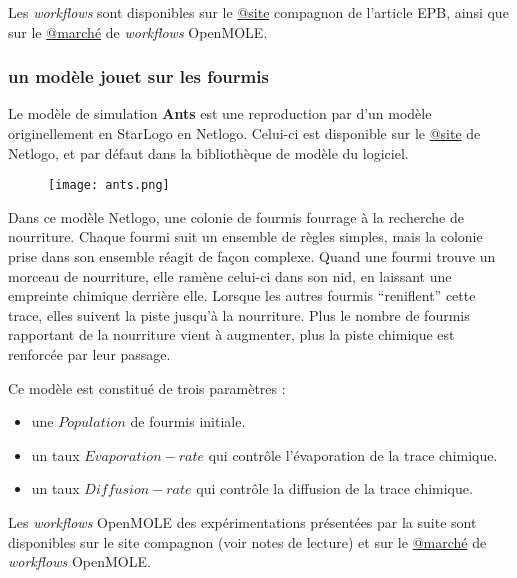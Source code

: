Les \textit{workflows} sont disponibles sur le \href{https://github.com/ISCPIF/simpoplocal-epb}{@site} compagnon de l'article EPB, ainsi que sur le \href{https://github.com/openmole/openmole-market}{@marché} de \textit{workflows} OpenMOLE.

\subsubsection{un modèle jouet sur les fourmis}

Le modèle de simulation \textbf{Ants} est une reproduction par \textcite{Wilensky1997} d'un modèle originellement en StarLogo en Netlogo. Celui-ci est disponible sur le \href{http://ccl.northwestern.edu/netlogo/models/Ants}{@site} de Netlogo, et par défaut dans la bibliothèque de modèle du logiciel.

\begin{figure}[H]
		\centering
	 	\texttt{[image: ants.png]}
\end{figure}

Dans ce modèle Netlogo, une colonie de fourmis fourrage à la recherche de nourriture. Chaque fourmi suit un ensemble de règles simples, mais la colonie prise dans son ensemble réagit de façon complexe. Quand une fourmi trouve un morceau de nourriture, elle ramène celui-ci dans son nid, en laissant une empreinte chimique derrière elle. Lorsque les autres fourmis \enquote{reniflent} cette trace, elles suivent la piste jusqu'à la nourriture. Plus le nombre de fourmis rapportant de la nourriture vient à augmenter, plus la piste chimique est renforcée par leur passage.

Ce modèle est constitué de trois paramètres :
\begin{itemize}[label=\textbullet,noitemsep,nolistsep]
\item une $Population$ de fourmis initiale.
\item un taux $Evaporation-rate$ qui contrôle l'évaporation de la trace chimique.
\item un taux $Diffusion-rate$ qui contrôle la diffusion de la trace chimique.
\end{itemize}

\medskip

Les \textit{workflows} OpenMOLE des expérimentations présentées par la suite sont disponibles sur le site compagnon (voir notes de lecture) et sur le \href{https://github.com/openmole/openmole-market}{@marché} de \textit{workflows} OpenMOLE.


